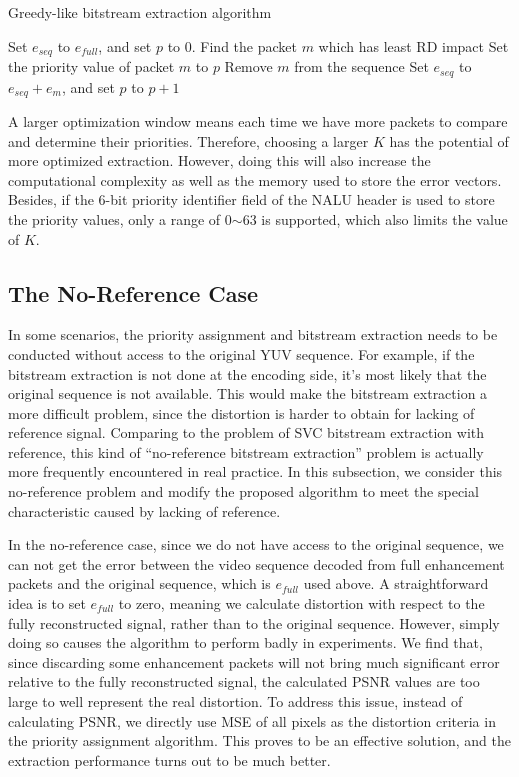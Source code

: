 \documentclass[journal]{IEEEtran}
\begin{document}
\begin{algorithm}
\caption{Greedy-like bitstream extraction algorithm}
\label{algo:greedy}
\begin{algorithmic}
    \STATE Set $e_{seq}$ to $e_{full}$, and set $p$ to 0.
		    \STATE Find the packet $m$ which has least RD impact
		\ENDFOR
		\STATE Set the priority value of packet $m$ to $p$
		\STATE Remove $m$ from the sequence
		\STATE Set $e_{seq}$ to $e_{seq} + e_m$, and set $p$ to $p+1$
    \ENDWHILE
\end{algorithmic}
\end{algorithm}

A larger optimization window means each time we have more packets to compare and determine their priorities. Therefore, choosing a larger $K$ has the potential of more optimized extraction. However, doing this will also increase the computational complexity as well as the memory used to store the error vectors. Besides, if the 6-bit priority identifier field of the NALU header is used to store the priority values, only a range of 0$\sim$63 is supported, which also limits the value of $K$.

\subsection{The No-Reference Case}
\label{subsec:noref-case}

In some scenarios, the priority assignment and bitstream extraction needs to be conducted without access to the original YUV sequence. For example, if the bitstream extraction is not done at the encoding side, it's most likely that the original sequence is not available. This would make the bitstream extraction a more difficult problem, since the distortion is harder to obtain for lacking of reference signal. Comparing to the problem of SVC bitstream extraction with reference, this kind of ``no-reference bitstream extraction'' problem is actually more frequently encountered in real practice. In this subsection, we consider this no-reference problem and modify the proposed algorithm to meet the special characteristic caused by lacking of reference.

In the no-reference case, since we do not have access to the original sequence, we can not get the error between the video sequence decoded from full enhancement packets and the original sequence, which is $e_{full}$ used above. A straightforward idea is to set $e_{full}$ to zero, meaning we calculate distortion with respect to the fully reconstructed signal, rather than to the original sequence. However, simply doing so causes the algorithm to perform badly in experiments. We find that, since discarding some enhancement packets will not bring much significant error relative to the fully reconstructed signal, the calculated PSNR values are too large to well represent the real distortion. To address this issue, instead of calculating PSNR, we directly use MSE of all pixels as the distortion criteria in the priority assignment algorithm. This proves to be an effective solution, and the extraction performance turns out to be much better.
\end{document}
